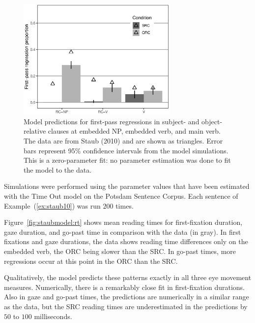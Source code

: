 \documentclass{cambridge7A}\usepackage[]{graphicx}\usepackage[]{color}
\newenvironment{knitrout}{}{} %
\begin{document}
\begin{figure}[tb]
  \centering
\begin{knitrout}
\color{fgcolor}

{\centering \includegraphics[width=0.7\textwidth]{figures/fig-staub10modelREG-1} 

}



\end{knitrout}
\caption[Predicted first-pass regressions from the model for subject- and object-relative clauses.]{Model predictions for first-pass regressions in subject- and object-relative clauses at embedded NP, embedded verb, and main verb. The data are from Staub (2010) and are shown as triangles. Error bars represent 95\% confidence intervals from the model simulations. This is a zero-parameter fit: no parameter estimation was done to fit the model to the data.} \label{fig:staubmodel:reg}
\end{figure}

Simulations were performed using the parameter values that have been estimated with the Time Out model on the Potsdam Sentence Corpus. 
Each sentence of Example~(\ref{ex:staub10}) was run $200$ times.

Figure~\ref{fig:staubmodel:rt} shows mean reading times for first-fixation duration, gaze duration, and go-past time in comparison with the data (in gray). 
In first fixations and gaze durations, the \cite{Staub2010a} data shows reading time differences only on the embedded verb, the ORC being slower than the SRC. In go-past times, more regressions occur at this point in the ORC than the SRC.

Qualitatively, the model predicts these patterns exactly in all three eye movement measures. Numerically, there is a remarkably close fit in first-fixation durations. Also in gaze and go-past times, the predictions are numerically in a similar range as the data, but the SRC reading times are underestimated in the predictions by $50$ to $100$ milliseconds.
\end{document}
